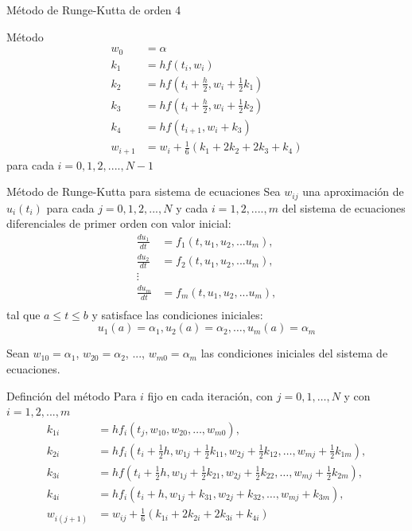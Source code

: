 \begin{frame}{Método de Runge-Kutta de orden 4}
\begin{block}{Método}
\begin{align*}
w_0 &= \alpha\\
k_1 &=hf(t_i, w_i)\\
k_2 &=hf(t_i+\frac{h}{2}, w_i+\frac{1}{2}k_1)\\
k_3 &=hf(t_i+\frac{h}{2}, w_i+\frac{1}{2}k_2)\\
k_4 &=hf(t_{i+1}, w_i+k_3)\\
w_{i+1}&=w_i+\frac{1}{6}(k_1+2k_2+2k_3+k_4)
\end{align*}
\hspace{3cm}para cada $i=0, 1, 2,...., N-1$
\end{block}
\end{frame}
\begin{frame}{Método de Runge-Kutta para sistema de ecuaciones}
Sea $w_{ij}$ una aproximación de $u_i(t_i)$ para cada $j=0, 1, 2,..., N$ y  cada $i=1, 2, ...., m$ del sistema de ecuaciones diferenciales de primer orden con valor inicial:
\begin{align*}
\frac{du_1}{dt}&=f_1(t, u_1, u_2,... u_m),\\
\frac{du_2}{dt}&=f_2(t, u_1, u_2,... u_m),\\
\vdots\\
\frac{du_m}{dt}&=f_m(t, u_1, u_2,... u_m),\\
\end{align*} 
tal que $a\leq t \leq b$ y satisface las condiciones iniciales: 
$$u_1(a)=\alpha_1, u_2(a)=\alpha_2,\hdots, u_m(a)=\alpha_m$$
\end{frame}



\begin{frame}
Sean $w_{10}=\alpha_1$, $w_{20}=\alpha_2$, ..., $w_{m0}=\alpha_m$ las condiciones iniciales del sistema de ecuaciones. 
\begin{block}{Definción del método}
Para $i$ fijo en cada iteración, con $j=0, 1, \hdots, N$ y con $i=1, 2, ..., m$
\begin{align*}
k_{1i} &= hf_i(t_j, w_{10}, w_{20}, \hdots, w_{m0}),\\
k_{2i} &= hf_i(t_i+\frac{1}{2}h, w_{1j}+\frac{1}{2}k_{11}, w_{2j}+\frac{1}{2}k_{12}, \hdots, w_{mj}+\frac{1}{2}k_{1m} ),\\
k_{3i} &= hf(t_i+\frac{1}{2}h, w_{1j}+\frac{1}{2}k_{21}, w_{2j}+\frac{1}{2}k_{22}, \hdots, w_{mj}+\frac{1}{2}k_{2m} ),\\
k_{4i}&=hf_i(t_i+h, w_{1j}+k_{31}, w_{2j}+k_{32}, \hdots, w_{mj}+k_{3m}),\\
w_{i(j+1)}&= w_{ij}+\frac{1}{6}(k_{1i}+2k_{2i}+2k_{3i}+k_{4i})
\end{align*} 
\end{block}
\end{frame}

